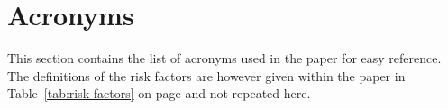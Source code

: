 \documentclass[12pt]{article}
\theoremstyle{definition}
\renewcommand{\_}{%
    \textunderscore\hspace{0pt}%
}
\begin{document}

%
%

\section{Acronyms}

This section contains the list of acronyms used in the paper for easy
reference. The definitions of the risk factors are however given
within the paper in Table~\ref{tab:risk-factors} on page
\pageref{tab:risk-factors} and not repeated here.
\end{document}
